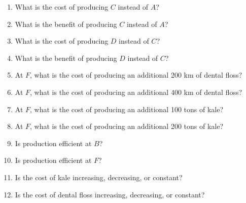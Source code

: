 \documentclass[
    letterpaper,paper=portrait,fleqn,
    DIV=16,fontsize=12pt,twoside=semi,
    parskip=full-,
    headings=standardclasses]
{scrartcl}
\begin{document}
\begin{enumerate}

\item What is the cost of producing $C$ instead of $A$?

\vfill

\item What is the benefit of producing $C$ instead of $A$?

\vfill

\item What is the cost of producing $D$ instead of $C$?

\vfill

\item What is the benefit of producing $D$ instead of $C$?

\vfill

\vspace{-2\baselineskip}

\clearpage

\item At $F$, what is the cost of producing an additional 200 km of dental floss?

\vfill

\item At $F$, what is the cost of producing an additional 400 km of dental floss?

\vfill

\item At $F$, what is the cost of producing an additional 100 tons of kale?

\vfill

\item At $F$, what is the cost of producing an additional 200 tons of kale?

\vfill

\item Is production efficient at $B$?

\vfill

\item Is production efficient at $F$?

\vfill

\item Is the cost of kale increasing, decreasing, or constant?

\vfill

\item Is the cost of dental floss increasing, decreasing, or constant?

\vfill

\vspace{-2\baselineskip}

\end{enumerate}
\end{document}
